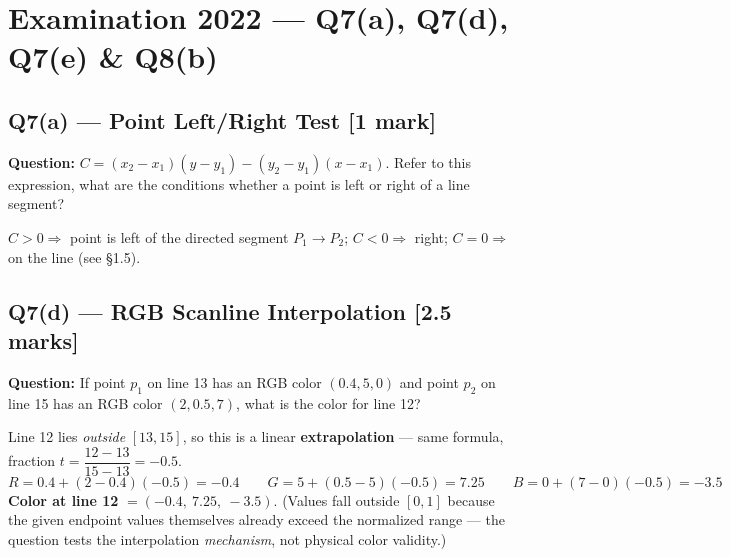 \documentclass[12pt, a4paper]{article}
\newenvironment{solutionbox}{\begin{mdframed}[style=solutionframe]}{\end{mdframed}}
\newenvironment{answerbox}{\begin{mdframed}[style=answerframe]}{\end{mdframed}}
\begin{document}
\section{Examination 2022 --- Q7(a), Q7(d), Q7(e) \& Q8(b)}

\subsection*{Q7(a) --- Point Left/Right Test [1 mark]}
\begin{solutionbox}
\textbf{Question:} $C=(x_2-x_1)(y-y_1)-(y_2-y_1)(x-x_1)$. Refer to this expression, what are the conditions whether a point is left or right of a line segment?
\end{solutionbox}
\begin{answerbox}
$C>0 \Rightarrow$ point is left of the directed segment $P_1\to P_2$; $C<0\Rightarrow$ right; $C=0\Rightarrow$ on the line (see \S1.5).
\end{answerbox}

\subsection*{Q7(d) --- RGB Scanline Interpolation [2.5 marks]}
\begin{solutionbox}
\textbf{Question:} If point $p_1$ on line 13 has an RGB color $(0.4,5,0)$ and point $p_2$ on line 15 has an RGB color $(2,0.5,7)$, what is the color for line 12?
\end{solutionbox}
\begin{answerbox}
Line 12 lies \emph{outside} $[13,15]$, so this is a linear \textbf{extrapolation} — same formula, fraction $t=\dfrac{12-13}{15-13}=-0.5$.
$$R=0.4+(2-0.4)(-0.5)=-0.4 \qquad G=5+(0.5-5)(-0.5)=7.25 \qquad B=0+(7-0)(-0.5)=-3.5$$
\textbf{Color at line 12} $=(-0.4,\ 7.25,\ -3.5)$. (Values fall outside $[0,1]$ because the given endpoint values themselves already exceed the normalized range — the question tests the interpolation \emph{mechanism}, not physical color validity.)
\end{answerbox}
\end{document}
